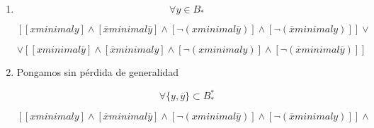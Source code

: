 \begin{enumerate}
\begin{enumerate}
\begin{enumerate}
\begin{enumerate}
\begin{enumerate}
\begin{enumerate}
            \begin{enumerate}
            \def\labelenumvii{\arabic{enumvii}.}
            \tightlist
            \item
              \[{\overline{x} \cdot y} = \overline{x}\]
            \item
              \[{{y = {{\overline{x} \cdot y} + {x \cdot y}}} = {\overline{x} + x}} = 1\]
            \end{enumerate}
          \item
            Supongamos\[y \neq 1\]

            \begin{enumerate}
            \def\labelenumvii{\arabic{enumvii}.}
            \tightlist
            \item
              \[\neg{({\overline{x}{\mathsf{\mathit{minimal}}y}})}\]
            \item
              \[{\overline{x} \cdot y} = 0\]
            \item
              \[{x + \overline{y}} = 1\]
            \item
              \[\overline{x}\mathsf{\mathit{minimal}}\overline{y}\]
            \end{enumerate}
          \end{enumerate}
        \end{enumerate}
      \item
        \[\forall{y \in B_{\ast}}\]

        \[\left\lbrack {{{\left\lbrack {x\mathsf{\mathit{minimal}}y} \right\rbrack \land \left\lbrack {\overline{x}\mathsf{\mathit{minimal}}\overline{y}} \right\rbrack} \land \left\lbrack {\neg{({x\mathsf{\mathit{minimal}}\overline{y}})}} \right\rbrack} \land \left\lbrack {\neg{({\overline{x}\mathsf{\mathit{minimal}}y})}} \right\rbrack} \right\rbrack \vee\]

        \[\vee \left\lbrack {{{\left\lbrack {x\mathsf{\mathit{minimal}}\overline{y}} \right\rbrack \land \left\lbrack {\overline{x}\mathsf{\mathit{minimal}}y} \right\rbrack} \land \left\lbrack {\neg{({x\mathsf{\mathit{minimal}}y})}} \right\rbrack} \land \left\lbrack {\neg{({\overline{x}\mathsf{\mathit{minimal}}\overline{y}})}} \right\rbrack} \right\rbrack\]
      \item
        Pongamos sin pérdida de generalidad

        \[\forall{{\{{y,\overline{y}}\}} \subset B_{\ast}^{\ast}}\]

        \[\left\lbrack {{{\left\lbrack {x\mathsf{\mathit{minimal}}y} \right\rbrack \land \left\lbrack {\overline{x}\mathsf{\mathit{minimal}}\overline{y}} \right\rbrack} \land \left\lbrack {\neg{({x\mathsf{\mathit{minimal}}\overline{y}})}} \right\rbrack} \land \left\lbrack {\neg{({\overline{x}\mathsf{\mathit{minimal}}y})}} \right\rbrack} \right\rbrack \land\]


\end{enumerate}
\end{enumerate}
\end{enumerate}
\end{enumerate}
